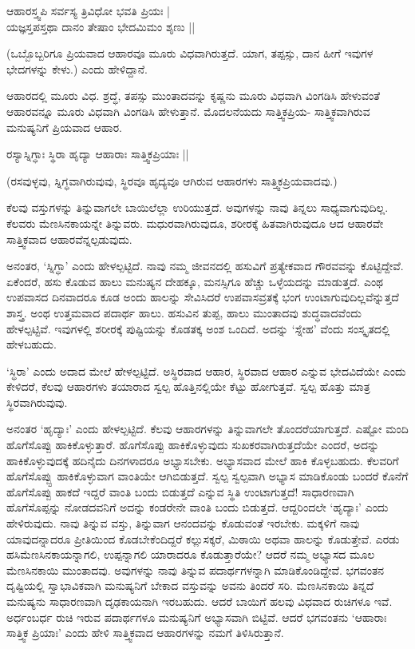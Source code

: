 \begin{shloka}
ಆಹಾರಸ್ತ್ವಪಿ ಸರ್ವಸ್ಯ ತ್ರಿವಿಧೋ ಭವತಿ ಪ್ರಿಯಃ |\\
ಯಜ್ಞಸ್ತಪಸ್ತಥಾ ದಾನಂ ತೇಷಾಂ ಭೇದಮಿಮಂ ಶೃಣು ||
\end{shloka}

(ಒಬ್ಬೊಬ್ಬರಿಗೂ ಪ್ರಿಯವಾದ ಆಹಾರವೂ ಮೂರು ವಿಧವಾಗಿರುತ್ತದೆ. ಯಾಗ, ತಪ್ಪಸ್ಸು, ದಾನ ಹೀಗೆ ಇವುಗಳ ಭೇದಗಳನ್ನು ಕೇಳು.) ಎಂದು ಹೇಳಿದ್ದಾನೆ.


ಆಹಾರದಲ್ಲಿ ಮೂರು ವಿಧ. ಶ್ರದ್ಧೆ, ತಪಸ್ಸು ಮುಂತಾದವನ್ನು  ಕೃಷ್ಣನು ಮೂರು ವಿಧವಾಗಿ ವಿಂಗಡಿಸಿ ಹೇಳುವಂತೆ ಆಹಾರವನ್ನೂ ಮೂರು ವಿಧವಾಗಿ ವಿಂಗಡಿಸಿ ಹೇಳುತ್ತಾನೆ. ಮೊದಲನೆಯದು ಸಾತ್ತ್ವಿಕಪ್ರಿಯ- ಸಾತ್ತ್ವಿಕವಾಗಿರುವ ಮನುಷ್ಯನಿಗೆ ಪ್ರಿಯವಾದ ಆಹಾರ.

\begin{shloka}
ರಸ್ಯಾಸ್ನಿಗ್ಧಾಃ ಸ್ಥಿರಾ ಹೃದ್ಯಾ ಆಹಾರಾಃ ಸಾತ್ತ್ವಿಕಪ್ರಿಯಾಃ ||
\end{shloka}

(ರಸವುಳ್ಳವು, ಸ್ನಿಗ್ಧವಾಗಿರುವುವು, ಸ್ಥಿರವೂ ಹೃದ್ಯವೂ ಆಗಿರುವ ಆಹಾರಗಳು ಸಾತ್ತ್ವಿಕಪ್ರಿಯವಾದವು.)

ಕೆಲವು ವಸ್ತುಗಳನ್ನು ತಿನ್ನುವಾಗಲೇ ಬಾಯಿಲೆಲ್ಲಾ ಉರಿಯುತ್ತದೆ. ಅವುಗಳನ್ನು ನಾವು ತಿನ್ನಲು ಸಾಧ್ಯವಾಗುವುದಿಲ್ಲ. ಕೆಲವರು ಮೆಣಸಿನಕಾಯನ್ನೇ ತಿನ್ನುವರು. ಮಧುರವಾಗಿರುವುದೂ, ಶರೀರಕ್ಕೆ ಹಿತವಾಗಿರುವುದೂ ಆದ ಆಹಾರವೇ ಸಾತ್ತ್ವಿಕವಾದ ಆಹಾರವೆನ್ನಲ್ಪಡುವುದು.

ಅನಂತರ, `ಸ್ನಿಗ್ಧಾ' ಎಂದು ಹೇಳಲ್ಪಟ್ಟಿದೆ. ನಾವು ನಮ್ಮ ಜೀವನದಲ್ಲಿ ಹಸುವಿಗೆ ಪ್ರತ್ಯೇಕವಾದ ಗೌರವವನ್ನು ಕೊಟ್ಟಿದ್ದೇವೆ. ಏಕೆಂದರೆ, ಹಸು ಕೊಡುವ ಹಾಲು ಮನುಷ್ಯನ ದೇಹಕ್ಕೂ, ಮನಸ್ಸಿಗೂ ಹೆಚ್ಚು ಒಳ್ಳೆಯದನ್ನು ಮಾಡುತ್ತದೆ. ಎಂಥ ಉಪವಾಸದ ದಿನವಾದರೂ ಕೂಡ ಅಂದು ಹಾಲನ್ನು ಸೇವಿಸಿದರೆ ಉಪವಾಸವ್ರತಕ್ಕೆ ಭಂಗ ಉಂಟಾಗುವುದಿಲ್ಲವೆನ್ನುತ್ತದೆ ಶಾಸ್ತ್ರ. ಅಂಥ ಉತ್ತಮವಾದ ಪದಾರ್ಥ ಹಾಲು. ಹಸುವಿನ ತುಪ್ಪ, ಹಾಲು ಮುಂತಾದವು ಶುದ್ಧವಾದವೆಂದು ಹೇಳಲ್ಪಟ್ಟಿವೆ. ಇವುಗಳಲ್ಲಿ ಶರೀರಕ್ಕೆ ಪುಷ್ಟಿಯನ್ನು ಕೊಡತಕ್ಕ ಅಂಶ ಒಂದಿದೆ. ಅದನ್ನು `ಸ್ನೇಹ' ವೆಂದು ಸಂಸ್ಕೃತದಲ್ಲಿ ಹೇಳಬಹುದು.

`ಸ್ಧಿರಾ' ಎಂದು ಅದಾದ ಮೇಲೆ ಹೇಳಲ್ಪಟ್ಟಿದೆ. ಅಸ್ಥಿರವಾದ ಆಹಾರ, ಸ್ಥಿರವಾದ ಆಹಾರ ಎನ್ನುವ ಭೇದವಿದೆಯೇ ಎಂದು ಕೇಳಿದರೆ, ಕೆಲವು ಆಹಾರಗಳು ತಯಾರಾದ ಸ್ವಲ್ಪ ಹೊತ್ತಿನಲ್ಲಿಯೇ ಕೆಟ್ಟು ಹೋಗುತ್ತವೆ. ಸ್ವಲ್ಪ ಹೊತ್ತು ಮಾತ್ರ ಸ್ಥಿರವಾಗಿರುವುವು.

ಅನಂತರ `ಹೃದ್ಯಾಃ' ಎಂದು ಹೇಳಲ್ಪಟ್ಟಿದೆ. ಕೆಲವು ಆಹಾರಗಳನ್ನು ತಿನ್ನುವಾಗಲೇ ತೊಂದರೆಯಾಗುತ್ತದೆ. ಎಷ್ಟೋ ಮಂದಿ ಹೊಗೆಸೊಪ್ಪು ಹಾಕಿಕೊಳ್ಳುತ್ತಾರೆ. ಹೊಗೆಸೊಪ್ಪು ಹಾಕಿಕೊಳ್ಳುವುದು ಸುಖಕರವಾಗಿರುತ್ತದೆಯೇ ಎಂದರೆ, ಅದನ್ನು ಹಾಕಿಕೊಳ್ಳುವುದಕ್ಕೆ ಹದಿನೈದು ದಿನಗಳಾದರೂ ಅಭ್ಯಾಸಬೇಕು. ಅಭ್ಯಾಸವಾದ ಮೇಲೆ ಹಾಕಿ ಕೊಳ್ಳಬಹುದು. ಕೆಲವರಿಗೆ ಹೊಗೆಸೊಪ್ಪ್ಪು ಹಾಕಿಕೊಳ್ಳುವಾಗ ವಾಂತಿಯೇ ಆಗಿಬಿಡುತ್ತದೆ. ಸ್ವಲ್ಪ ಸ್ವಲ್ಪವಾಗಿ ಅಭ್ಯಾಸ ಮಾಡಿಕೊಂಡು ಬಂದರೆ ಕೊನೆಗೆ ಹೊಗೆಸೊಪ್ಪು ಹಾಕದೆ ಇದ್ದರೆ ವಾಂತಿ ಬಂದು ಬಿಡುತ್ತದೆ ಎನ್ನುವ ಸ್ಥಿತಿ ಉಂಟಾಗುತ್ತದೆ! ಸಾಧಾರಣವಾಗಿ ಹೊಗೆಸೊಪ್ಪನ್ನು ನೋಡದವನಿಗೆ ಅದನ್ನು ಕಂಡರೇನೇ ವಾಂತಿ ಬಂದು ಬಿಡುತ್ತದೆ. ಆದ್ದರಿಂದಲೇ `ಹೃದ್ಯಾಃ' ಎಂದು ಹೇಳಿರುವುದು. ನಾವು ತಿನ್ನುವ ವಸ್ತು, ತಿನ್ನುವಾಗ ಆನಂದವನ್ನು ಕೊಡುವಂತೆ ಇರಬೇಕು. ಮಕ್ಕಳಿಗೆ ನಾವು ಯಾವುದನ್ನಾದರೂ ಪ್ರೀತಿಯಿಂದ ಕೊಡಬೇಕೆಂದಿದ್ದರೆ ಕಲ್ಲುಸಕ್ಕರೆ, ಮಿಠಾಯಿ ಅಥವಾ ಹಾಲನ್ನು ಕೊಡುತ್ತೇವೆ. ಎರಡು ಹಸಿಮೆಣಸಿನಕಾಯನ್ನಾಗಲಿ, ಉಪ್ಪನ್ನಾಗಲಿ ಯಾರಾದರೂ ಕೊಡುತ್ತಾರೆಯೇ? ಆದರೆ ನಮ್ಮ ಅಭ್ಯಾಸದ ಮೂಲ ಮೆಣಸಿನಕಾಯಿ ಮುಂತಾದವು. ಅವುಗಳನ್ನು ನಾವು ತಿನ್ನುವ ಪದಾರ್ಥಗಳನ್ನಾಗಿ ಮಾಡಿಕೊಂಡಿದ್ದೇವೆ. ಭಗವಂತನ ದೃಷ್ಟಿಯಲ್ಲಿ ಸ್ವಾಭಾವಿಕವಾಗಿ ಮನುಷ್ಯನಿಗೆ ಬೇಕಾದ ವಸ್ತುವನ್ನು ಅವನು ತಿಂದರೆ ಸರಿ. ಮೆಣಸಿನಕಾಯಿ ತಿನ್ನದೆ ಮನುಷ್ಯನು ಸಾಧಾರಣವಾಗಿ ದೃಢಕಾಯನಾಗಿ ಇರಬಹುದು. ಆದರೆ ಬಾಯಿಗೆ ಹಲವು ವಿಧವಾದ ರುಚಿಗಳೂ ಇವೆ. ಅರ್ಧಂಬರ್ಧ ರುಚಿ ಇರುವ ಪದಾರ್ಥಗಳೂ ಮನುಷ್ಯನಿಗೆ ಅಭ್ಯಾಸವಾಗಿ ಬಿಟ್ಟಿವೆ. ಆದರೆ ಭಗವಂತನು `ಆಹಾರಾಃ ಸಾತ್ತ್ವಿಕ ಪ್ರಿಯಾಃ' ಎಂದು ಹೇಳಿ ಸಾತ್ತ್ವಿಕವಾದ ಆಹಾರಗಳನ್ನು ನಮಗೆ ತಿಳಿಸಿರುತ್ತಾನೆ.

